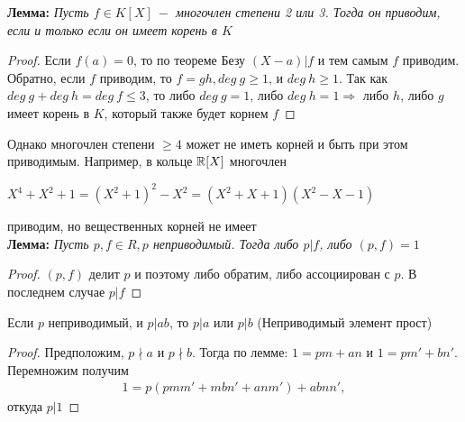 \begin{normalsize}
    \textbf{Лемма:}
    \textit{Пусть $f \in K[X] \ - $ многочлен степени 2 или 3. Тогда он приводим, если и только если он имеет 
    корень в $K$}
    \begin{proof}
        Если $f(a) = 0$, то по теореме Безу $(X - a)|f$ и тем самым $f$ приводим.
        Обратно, если $f$ приводим, то $f = gh, deg \ g \geqslant 1$, и $deg \ h \geqslant 1$.
        Так как $deg \ g + deg \ h = deg \ f \leqslant 3$, то либо $deg \ g  = 1$, либо $deg \ h  = 1
        \Longrightarrow$ либо $h$, либо $g$ имеет корень в $K$, который также будет корнем $f$
    \end{proof}
    \qquad Однако многочлен степени $\geqslant 4$ может не иметь корней и быть при этом приводимым. Например, в кольце $\mathbb{R}[X]$ многочлен
    \begin{center}
        $X^4 + X^2 + 1 = (X^2 + 1)^2 - X^2 = (X^2 + X + 1)(X^2 - X - 1)$
    \end{center}
    приводим, но вещественных корней не имеет \\
    \textbf{Лемма:}
    \textit{Пусть $p, f \in R, p$ неприводимый. Тогда либо $p | f$, либо $(p, f) = 1$}
    \begin{proof}
        $(p, f)$ делит $p$ и поэтому либо обратим, либо ассоциирован с $p$. В последнем случае
        $p | f$
    \end{proof}
    \begin{theorem-non}
        Если $p$ неприводимый, и $p | ab$, то $p | a$ или $p | b$ (Неприводимый элемент прост)
    \end{theorem-non}
    \begin{proof}
        Предположим, $p \nmid a$ и $p \nmid b$. Тогда по лемме: $1 = pm + an$ и $1 = pm' + bn'$.
        Перемножим получим 
        \begin{gather*}
            1 = p(pmm' + mbn' + anm') + abnn',
        \end{gather*}
        откуда $p | 1$
    \end{proof}
\end{normalsize}